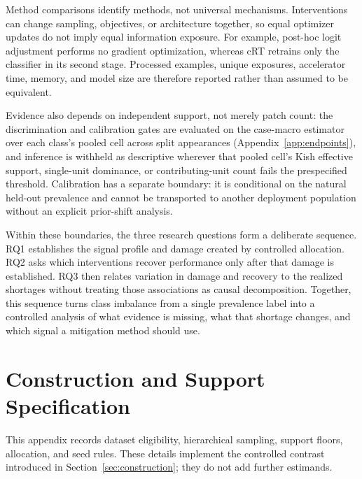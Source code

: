 \documentclass[11pt]{article}
\begin{document}
Method comparisons identify methods, not universal mechanisms. Interventions can change sampling, objectives, or architecture together, so equal optimizer updates do not imply equal information exposure. For example, post-hoc logit adjustment performs no gradient optimization, whereas cRT retrains only the classifier in its second stage. Processed examples, unique exposures, accelerator time, memory, and model size are therefore reported rather than assumed to be equivalent.

Evidence also depends on independent support, not merely patch count: the discrimination and calibration gates are evaluated on the case-macro estimator over each class's pooled cell across split appearances (Appendix~\ref{app:endpoints}), and inference is withheld as descriptive wherever that pooled cell's Kish effective support, single-unit dominance, or contributing-unit count fails the prespecified threshold. Calibration has a separate boundary: it is conditional on the natural held-out prevalence and cannot be transported to another deployment population without an explicit prior-shift analysis.

Within these boundaries, the three research questions form a deliberate sequence. RQ1 establishes the signal profile and damage created by controlled allocation. RQ2 asks which interventions recover performance only after that damage is established. RQ3 then relates variation in damage and recovery to the realized shortages without treating those associations as causal decomposition. Together, this sequence turns class imbalance from a single prevalence label into a controlled analysis of what evidence is missing, what that shortage changes, and which signal a mitigation method should use.

\clearpage
\appendix
{}
{}
\section{Construction and Support Specification}
\label{app:construction}
This appendix records dataset eligibility, hierarchical sampling, support floors, allocation, and seed rules. These details implement the controlled contrast introduced in Section~\ref{sec:construction}; they do not add further estimands.
\end{document}
